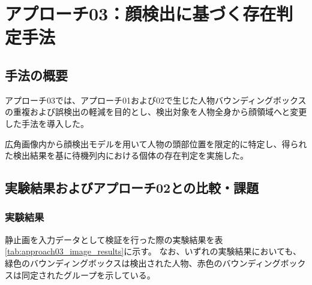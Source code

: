 \section{アプローチ03：顔検出に基づく存在判定手法}

\subsection{手法の概要}
アプローチ03では、アプローチ01および02で生じた人物バウンディングボックスの重複および誤検出の軽減を目的とし、検出対象を人物全身から顔領域へと変更した手法を導入した。

広角画像内から顔検出モデルを用いて人物の頭部位置を限定的に特定し、得られた検出結果を基に待機列内における個体の存在判定を実施した。

\subsection{実験結果およびアプローチ02との比較・課題}

\subsubsection{実験結果}
静止画を入力データとして検証を行った際の実験結果を表\ref{tab:approach03_image_results}に示す。
なお、いずれの実験結果においても、緑色のバウンディングボックスは検出された人物、赤色のバウンディングボックスは同定されたグループを示している。

